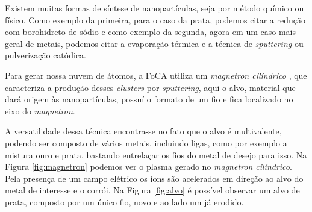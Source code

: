 Existem muitas formas de síntese de nanopartículas, seja por método químico ou físico. Como exemplo da primeira, para o caso da prata, podemos citar a redução com borohidreto de sódio e como exemplo da segunda, agora em um caso mais geral de metais, podemos citar a evaporação térmica e a técnica de \textit{sputtering} ou pulverização catódica.

Para gerar nossa nuvem de átomos, a FoCA utiliza um \textit{magnetron cilíndrico} \cite{ref_artigo_foca}, que caracteriza a produção desses \textit{clusters} por \textit{sputtering}, aqui o alvo, material que dará origem às nanopartículas, possuí o formato de um fio e fica localizado no eixo do \textit{magnetron}.

A versatilidade dessa técnica encontra-se no fato que o alvo é multivalente, podendo ser composto de vários metais, incluindo ligas, como por exemplo a mistura ouro e prata, bastando entrelaçar os fios do metal de desejo para isso. Na Figura \ref{fig:magnetron} podemos ver o plasma gerado no \textit{magnetron cilíndrico}. Pela presença de um campo elétrico os íons são acelerados em direção ao alvo do metal de interesse e o corrói. Na Figura \ref{fig:alvo} é possível observar um alvo de prata, composto por um único fio, novo e ao lado um já erodido.

